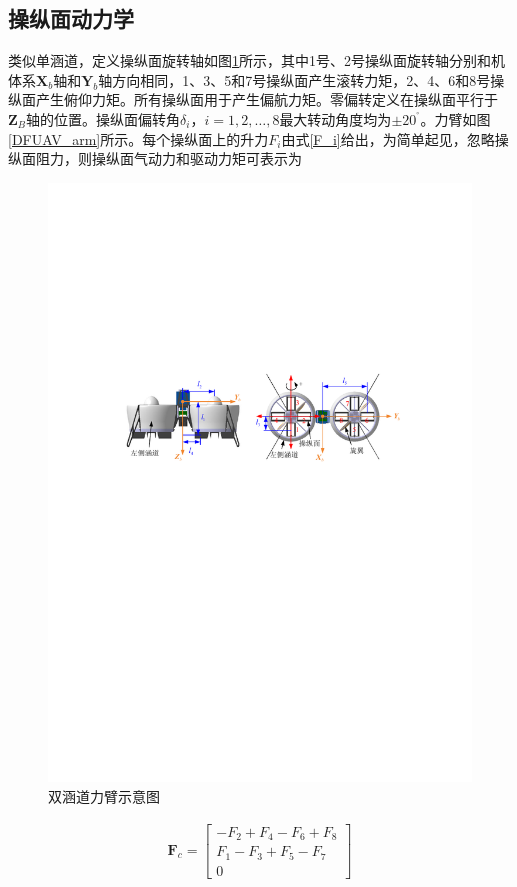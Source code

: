\subsection{操纵面动力学}
类似单涵道，定义操纵面旋转轴如图\ref{TDFUAV_arm}所示，其中1号、2号操纵面旋转轴分别和机体系$ \bm{X}_b $轴和$ \bm{Y}_b $轴方向相同，1、3、5和7号操纵面产生滚转力矩，2、4、6和8号操纵面产生俯仰力矩。所有操纵面用于产生偏航力矩。零偏转定义在操纵面平行于${{\bm{Z}}_{B}}$轴的位置。操纵面偏转角$\delta_i  $，$ i=1,2,\ldots,8 $最大转动角度均为$\pm {{20}^{{}^\circ }}$。力臂如图\ref{DFUAV_arm}所示。每个操纵面上的升力$ F_i $由式\eqref{F_i}给出，为简单起见，忽略操纵面阻力，则操纵面气动力和驱动力矩可表示为
\begin{figure}[htbp]
	\centering	
	\includegraphics[scale=1]{Fig/TDFUAV_arm.pdf}%
	\caption{\label{TDFUAV_arm}双涵道力臂示意图}
\end{figure}
\begin{align}
\bm{F}_{c}=\begin{bmatrix}
-F_2+F_4-F_6+F_8	\\
F_1-F_3+F_5-F_7 \\
0
\end{bmatrix}
\end{align}
